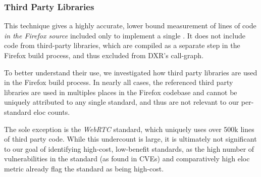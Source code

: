 \subsubsection{Third Party Libraries}
\label{cost-benefit:methodology:third-party-libraries}
This technique gives a highly accurate, lower bound measurement of lines of code
\emph{in the Firefox source} included only to implement a single \WAS.  It does not
include code from third-party libraries, which are compiled as a separate step
in the Firefox build process, and thus excluded from DXR's call-graph.

To better understand their use, we investigated how third party libraries are
used in the Firefox build process. In nearly
all cases, the referenced third party libraries are used in
multiples places in the Firefox codebase and cannot be uniquely
attributed to any single standard, and thus are not relevant to our per-standard \gls{eloc} counts.

The sole exception is the \textit{WebRTC} standard, which uniquely uses over 500k
lines of third party code.  While this undercount is large, it is ultimately not significant
to our goal of identifying high-cost, low-benefit standards, as the high number
of vulnerabilities in the standard  (as found in CVEs) and comparatively high \gls{eloc} metric  already
flag the standard as being high-cost.


